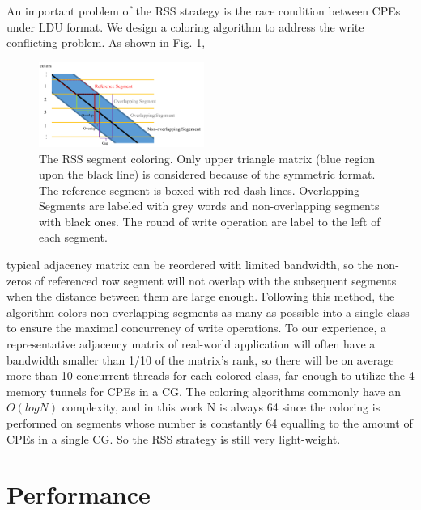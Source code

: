 \documentclass[5p,times]{elsarticle}
\begin{document}
An important problem of the RSS strategy is the race condition between CPEs under LDU format. We design a coloring algorithm to address the write conflicting problem. As shown in Fig. \ref{rss_color},
\begin{figure}[tbp]
	\centerline{\includegraphics[width=0.48\textwidth]{rss_color.pdf}}
	\caption{The RSS segment coloring. Only upper triangle matrix (blue region upon the black line) is considered because of the symmetric format. The reference segment is boxed with red dash lines. Overlapping Segments are labeled with grey words and non-overlapping segments with black ones. The round of write operation are label to the left of each segment.}
	\label{rss_color}
\end{figure}
 typical adjacency matrix can be reordered with limited bandwidth, so the non-zeros of referenced row segment will not overlap with the subsequent segments when the distance between them are large enough. Following this method, the algorithm colors non-overlapping segments as many as possible into a single class to ensure the maximal concurrency of write operations. To our experience, a representative adjacency matrix of real-world application will often have a bandwidth smaller than 1/10 of the matrix’s rank, so there will be on average more than 10 concurrent threads for each colored class, far enough to utilize the 4 memory tunnels for CPEs in a CG. The coloring algorithms commonly have an $O(logN)$ complexity, and in this work N is always 64 since the coloring is performed on segments whose number is constantly 64 equalling to the amount of CPEs in a single CG. So the RSS strategy is still very light-weight.
 
 \section{Performance}
 \label{sec:perf}
\end{document}
